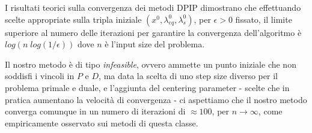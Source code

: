 I risultati teorici sulla convergenza dei metodi DPIP \cite{Nocedal2006Numerical} dimostrano che effettuando scelte appropriate sulla tripla iniziale $(x^0, \lambda_{eq}^0, \lambda_s^0)$, per $\epsilon > 0$ fissato, il limite superiore al numero delle iterazioni per garantire la convergenza dell'algoritmo è $log(n\; log(1/\epsilon))$ dove $n$ è l'input size del problema.

Il nostro metodo è di tipo \textit{infeasible}, 
ovvero ammette un punto iniziale che non soddisfi i vincoli in $P$ e $D$, ma data la scelta di uno step size diverso per il problema primale e duale, e l'aggiunta del centering parameter - scelte che in pratica aumentano la velocità di convergenza - ci aspettiamo che il nostro metodo converga comunque in un numero di iterazioni di $\approx 100$, per $n \rightarrow \infty$, come empiricamente osservato sui metodi di questa classe.